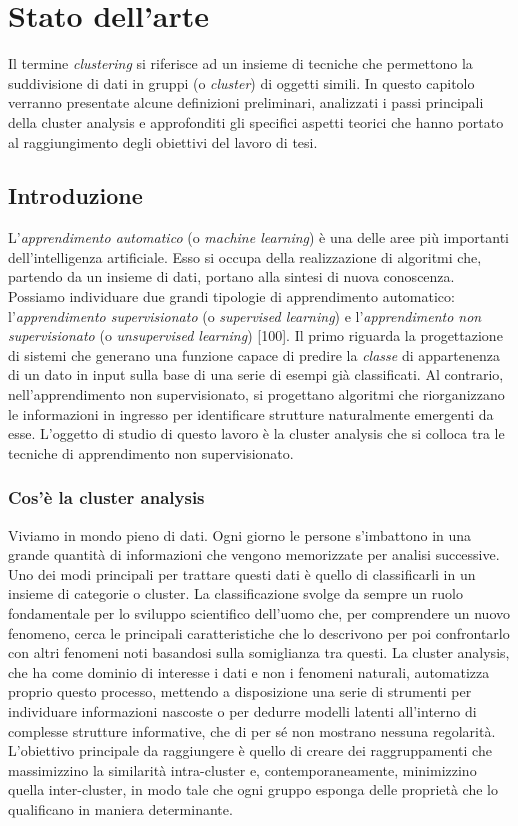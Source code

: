 \chapter{Stato dell'arte}
\label{capitolo2}
\thispagestyle{empty}

\noindent
Il termine \textit{clustering} si riferisce ad un insieme di tecniche che permettono la suddivisione di dati in gruppi (o \textit{cluster}) di oggetti simili. In questo capitolo verranno presentate alcune definizioni preliminari, analizzati i passi principali della cluster analysis e approfonditi gli specifici aspetti teorici che hanno portato al raggiungimento degli obiettivi del lavoro di tesi.

\section{Introduzione}
L'\textit{apprendimento automatico} (o \textit{machine learning}) \`e una delle aree pi\`u importanti dell'intelligenza artificiale. Esso si occupa della realizzazione di algoritmi che, partendo da un insieme di dati, portano alla sintesi di nuova conoscenza. Possiamo individuare due grandi tipologie di apprendimento automatico: l'\textit{apprendimento supervisionato} (o \textit{supervised learning}) e l'\textit{apprendimento non supervisionato} (o \textit{unsupervised learning}) [100]. Il primo riguarda la progettazione di sistemi che generano una funzione capace di predire la \textit{classe} di appartenenza di un dato in input sulla base di una serie di esempi gi\`a classificati. Al contrario, nell'apprendimento non supervisionato, si progettano algoritmi che riorganizzano le informazioni in ingresso per identificare strutture naturalmente emergenti da esse. L'oggetto di studio di questo lavoro \`e la cluster analysis che si colloca tra le tecniche di apprendimento non supervisionato. 

\subsection{Cos'\`e la cluster analysis} 
Viviamo in mondo pieno di dati. Ogni giorno le persone s'imbattono in una grande quantit\`a di informazioni che vengono memorizzate per analisi successive. Uno dei modi principali per trattare questi dati \`e quello di classificarli in un insieme di categorie o cluster. La classificazione svolge da sempre un ruolo fondamentale per lo sviluppo scientifico dell'uomo che, per comprendere un nuovo fenomeno, cerca le principali caratteristiche che lo descrivono per poi confrontarlo con altri fenomeni noti basandosi sulla somiglianza tra questi. 
La cluster analysis, che ha come dominio di interesse i dati e non i fenomeni naturali, automatizza proprio questo processo, mettendo a disposizione una serie di strumenti per individuare informazioni nascoste o per dedurre modelli latenti all'interno di complesse strutture informative, che di per s\'e non mostrano nessuna regolarit\`a. 
L'obiettivo principale da raggiungere \`e quello di creare dei raggruppamenti che massimizzino la similarit\`a intra-cluster e, contemporaneamente, minimizzino quella inter-cluster, in modo tale che ogni gruppo esponga delle propriet\`a che lo qualificano in maniera determinante.

